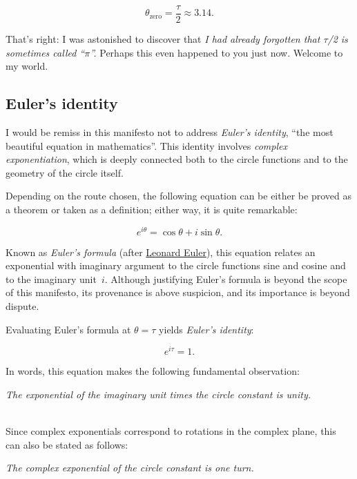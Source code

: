 \documentclass{article}
\begin{document}
\[
  \theta_\mathrm{zero} = \frac{\tau}{2} \approx 3.14.
\]

\noindent That's right: I was astonished to discover that \emph{I had already forgotten that $\tau$/2 is sometimes called ``$\pi$''.} Perhaps this even happened to you just now. Welcome to my world.



   \subsection{Euler's identity} %
   \label{sec:euler_s_formula}

I would be remiss in this manifesto not to address \emph{Euler's identity}, ``the most beautiful equation in mathematics''. This identity involves \emph{complex exponentiation}, which is deeply connected both to the circle functions and to the geometry of the circle itself.

Depending on the route chosen, the following equation can be either be proved as a theorem or taken as a definition; either way, it is quite remarkable:

\[ e^{i\theta} = \cos\theta + i\sin\theta. \]

\noindent Known as \emph{Euler's formula} (after \href{http://en.wikipedia.org/wiki/Leonhard_Euler}{Leonard Euler}), this equation relates an exponential with imaginary argument to the circle functions sine and cosine and to the imaginary unit~$i$. Although justifying Euler's formula is beyond the scope of this manifesto, its provenance is above suspicion, and its importance is beyond dispute.

Evaluating Euler's formula at $\theta = \tau$ yields \emph{Euler's identity}:

\[ e^{i\tau} = 1. \]

\noindent In words, this equation makes the following fundamental observation: 

\begin{center}
\emph{The exponential of the imaginary unit times the circle constant is unity.}
\end{center}

\\

\noindent Since complex exponentials correspond to rotations in the complex plane, this can also be stated as follows:

\begin{center}
\emph{The complex exponential of the circle constant is one turn.}
\end{center}
\end{document}
